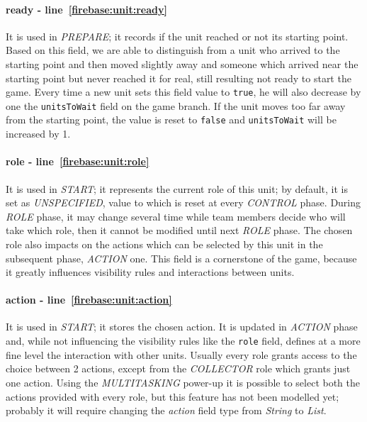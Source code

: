 				\paragraph{ready - line~\ref{firebase:unit:ready}}
				It is used in \emph{PREPARE}; it records if the unit reached or not its starting point. Based on this field, we are able to distinguish from a unit who arrived to the starting point and then moved slightly away and someone which arrived near the starting point but never reached it for real, still resulting not ready to start the game. Every time a new unit sets this field value to \lstinline|true|, he will also decrease by one the \lstinline|unitsToWait| field on the game branch.
				If the unit moves too far away from the starting point, the value is reset to \lstinline|false| and \lstinline|unitsToWait| will be increased by 1. 
				
				\paragraph{role - line~\ref{firebase:unit:role}}
				It is used in \emph{START}; it represents the current role of this unit; by default, it is set as \emph{UNSPECIFIED}, value to which is reset at every \emph{CONTROL} phase.
				During \emph{ROLE} phase, it may change several time while team members decide who will take which role, then it cannot be modified until next \emph{ROLE} phase.
				The chosen role also impacts on the actions which can be selected by this unit in the subsequent phase, \emph{ACTION} one.
				This field is a cornerstone of the game, because it greatly influences visibility rules and interactions between units.
				
				\paragraph{action - line~\ref{firebase:unit:action}}
				It is used in \emph{START}; it stores the chosen action. It is updated in \emph{ACTION} phase and, while not influencing the visibility rules like the \lstinline|role| field, defines at a more fine level the interaction with other units. Usually every role grants access to the choice between 2 actions, except from the \emph{COLLECTOR} role which grants just one action. Using the \emph{MULTITASKING} power-up it is possible to select both the actions provided with every role, but this feature has not been modelled yet; probably it will require changing the \emph{action} field type from \emph{String} to \emph{List}.
				
